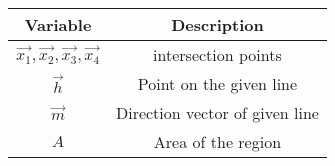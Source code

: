 \begin{tabular}[12pt]{ |c|c|}
    \hline
    \textbf{Variable} & \textbf{Description}\\ 
    \hline
    $\vec{x_1},\vec{x_2},\vec{x_3},\vec{x_4}$ &  intersection points\\
    \hline
    $\vec{h}$ & Point on the given line\\
    \hline
    $\vec{m}$ & Direction vector of given line\\
    \hline
    $A$ & Area of the region\\
    \hline
\end{tabular}
